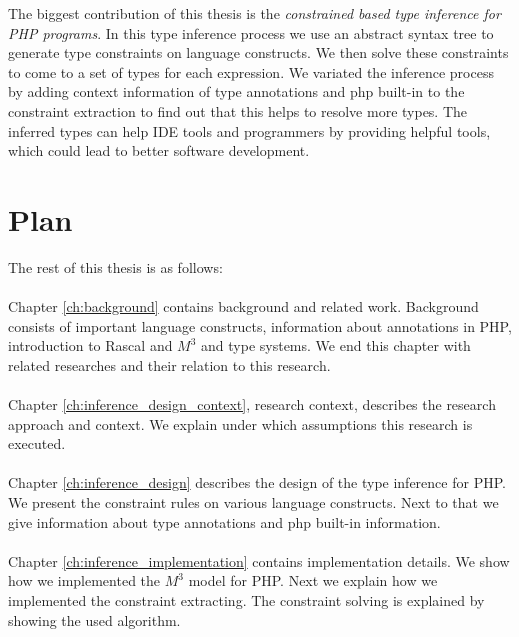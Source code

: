 \documentclass[../main.tex]{subfiles}
\begin{document}
		The biggest contribution of this thesis is the \textit{constrained based type inference for PHP programs}.
		In this type inference process we use an abstract syntax tree to generate type constraints on language constructs.
		We then solve these constraints to come to a set of types for each expression.
		We variated the inference process by adding context information of type annotations and php built-in to the constraint extraction to find out that this helps to resolve more types.
		The inferred types can help IDE tools and programmers by providing helpful tools, which could lead to better software development.        
    
    \section{Plan} 
        The rest of this thesis is as follows:
        
        \paragraph{}
        Chapter \ref{ch:background} contains background and related work.
        Background consists of important language constructs, information about annotations in PHP, introduction to Rascal and $M^3$ and type systems. 
        We end this chapter with related researches and their relation to this research.
        
        \paragraph{}
        Chapter \ref{ch:inference_design_context}, research context, describes the research approach and context.
        We explain under which assumptions this research is executed.
        
        \paragraph{}
        Chapter \ref{ch:inference_design} describes the design of the type inference for PHP.
        We present the constraint rules on various language constructs.
        Next to that we give information about type annotations and php built-in information. 
        
        \paragraph{}
        Chapter \ref{ch:inference_implementation} contains implementation details.
        We show how we implemented the $M^3$ model for PHP.
        Next we explain how we implemented the constraint extracting.
        The constraint solving is explained by showing the used algorithm.
        
\end{document}
